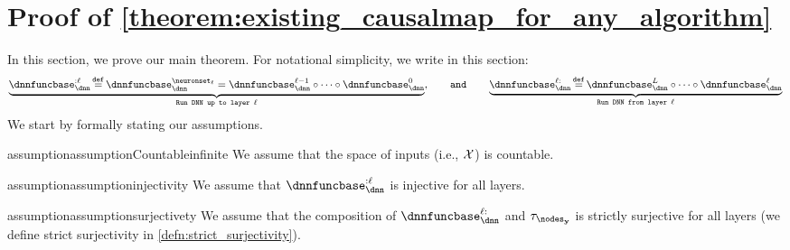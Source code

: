 \section{Proof of \texorpdfstring{\cref{theorem:existing_causalmap_for_any_algorithm}}{Theorem}}
\label{appsec:Linear_Representation_Hypothesis_vs_DAS}

\mydnnmacro{\neuronsetPartition}{\boldsymbol{\Psi}}

In this section, we prove our main theorem. 
For notational simplicity, we write in this section:
\begin{align}
    \underbrace{\dnnfunclayer{:\layer} \defeq \dnnfunclayer{\neuronset_{\layer}} = \dnnfunclayer{\layer-1}\circ\cdots\circ\dnnfunclayer{0}}_{\texttt{Run DNN up to layer } \layer},
    \qquad\mathtt{and}\qquad
    \underbrace{\dnnfunclayer{\layer:} \defeq \dnnfunclayer{\nlayers}\circ\cdots\circ\dnnfunclayer{\layer}}_{\texttt{Run DNN from layer } \layer}
\end{align}
We start by formally stating our assumptions.

\begin{restatable}{assumption}{assumptionCountableinfinite}
\label{assumption:Countable_infinite}
    We assume that the space of inputs (i.e., $\mathcal{X}$) is countable.
\end{restatable}

\begin{restatable}{assumption}{assumptioninjectivity}
\label{assumption:injectivity}
    We assume that $\dnnfunclayer{:\layer}$ is injective for all layers. %
\end{restatable}

\begin{restatable}{assumption}{assumptionsurjectivety}
\label{assumption:surjectivety}
    We assume that the composition of $\dnnfunclayer{\layer:}$ and $\abstractionmap_{\nodesoutput}$ is strictly surjective for all layers (we define strict surjectivity in \cref{defn:strict_surjectivity}).
\end{restatable}

